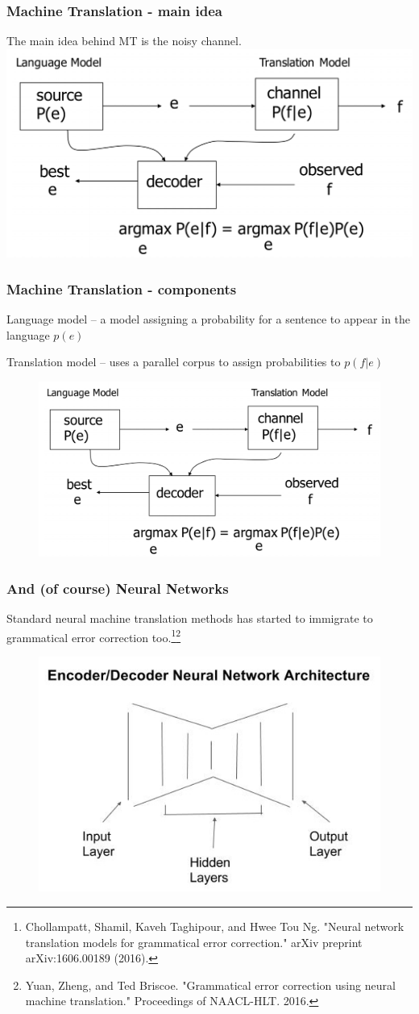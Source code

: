 \documentclass{beamer}
\begin{document}
\begin{frame}
	\frametitle{Machine Translation - main idea}
	The main idea behind MT is the noisy channel.
	\centering
	\includegraphics[width=0.8\linewidth]{noisy}
\end{frame}

\begin{frame}
	\frametitle{Machine Translation - components}
	Language model -- a model assigning a probability for a sentence to appear in the language $p\left(e\right)$
	
	Translation model -- uses a parallel corpus to assign probabilities to $p\left(f|e\right)$ 
	\begin{figure}
		\includegraphics[width=0.8\linewidth]{noisy}
	\end{figure}
\end{frame}

\begin{frame}
	\frametitle{And (of course) Neural Networks}
	Standard neural machine translation methods has started to immigrate to grammatical error correction too.\footnote{\tiny Chollampatt, Shamil, Kaveh Taghipour, and Hwee Tou Ng. "Neural network translation models for grammatical error correction." arXiv preprint arXiv:1606.00189 (2016).}\footnote{\tiny Yuan, Zheng, and Ted Briscoe. "Grammatical error correction using neural machine translation." Proceedings of NAACL-HLT. 2016.}
	\begin{figure}[b]
		\centering
			\includegraphics[width=.6\linewidth]{encdec}
	\end{figure}
\end{frame}
\end{document}
